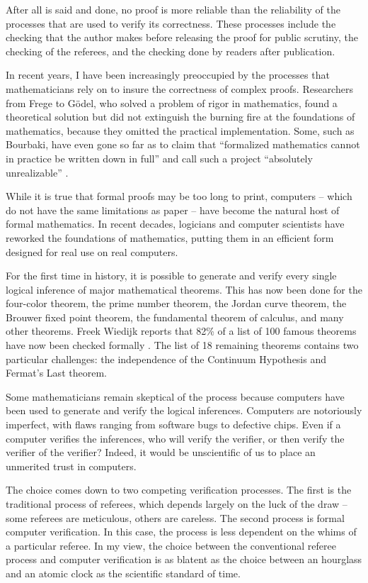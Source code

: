 After all is said and done, no proof is more reliable than the
reliability of the processes that are used to verify its
correctness.  These processes include the checking that the author
makes before releasing the proof for public scrutiny, the checking
of the referees, and the checking done by readers after publication.

In recent years, I have been increasingly preoccupied by the
processes that mathematicians rely on to insure the correctness of complex
proofs. Researchers from Frege to G\"odel, who solved a problem of
rigor in mathematics, found a theoretical solution but did not
extinguish the burning fire at the foundations of mathematics,
because they omitted the practical implementation. Some, such as
Bourbaki, have even gone so far as to claim that ``formalized
mathematics cannot in practice be written down in full'' and call
such a project
``absolutely unrealizable'' \cite[p 10,11]{Bour:68:Sets}. %

While it is true that formal proofs may be too long to print,
computers -- which do not have the same limitations as paper -- have
become the natural host of formal mathematics. In recent decades,
logicians and computer scientists have reworked the foundations of
mathematics, putting them in an efficient form designed for real use
on real computers.

For the first time in history, it is possible to generate and verify
every single logical inference of major mathematical theorems.  This
has now been done for the four-color theorem, the prime number
theorem, the Jordan curve theorem, the Brouwer fixed point theorem,
the fundamental theorem of calculus, and many other theorems.  Freek
Wiedijk reports that 82\% of a list of 100 famous theorems have now
been checked formally \cite{wiedijk:100}.  The list of 18 remaining theorems contains two particular challenges: the independence of the Continuum Hypothesis and Fermat's Last theorem.

Some mathematicians remain skeptical of the process because
computers have been used to generate and verify the logical
inferences.  Computers are notoriously imperfect, with flaws ranging
from software bugs to defective chips.  Even if a computer verifies
the inferences, who will verify the verifier, or then verify the
verifier of the verifier?  
Indeed, it would be unscientific of us to
place an unmerited trust in computers.

The choice comes down to two competing verification processes.  The first is the traditional
process of referees, which depends largely on the luck of the draw
-- some referees are meticulous, others are careless.   The second
process is formal computer verification. In this case, the process
is less dependent on the whims of a particular referee.
In my view, the choice between the conventional referee process and
computer verification is as blatent as the choice between an
hourglass and an atomic clock as the scientific standard of time.


